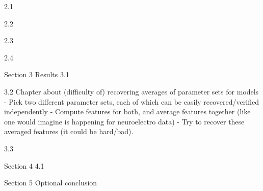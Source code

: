 \documentclass[12pt,letterpaper]{report}
\begin{document}

2.1

2.2

2.3

2.4

Section 3
Results
3.1

3.2
Chapter about (difficulty of) recovering averages of parameter sets for models
- Pick two different parameter sets, each of which can be easily recovered/verified independently
- Compute features for both, and average features together (like one would imagine is happening for neuroelectro data)
- Try to recover these averaged features (it could be hard/bad).

3.3

Section 4
4.1

Section 5
Optional conclusion
{\singlespace

}
\renewcommand{\chaptername}{APPENDIX}
%

\end{document}

